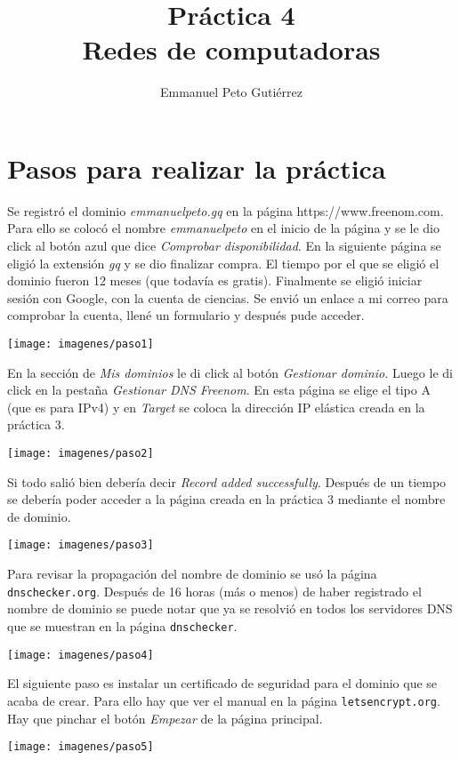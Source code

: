 \documentclass{article}
\title{Práctica 4\\Redes de computadoras}
\author{Emmanuel Peto Gutiérrez}
\begin{document}
\maketitle

\section{Pasos para realizar la práctica}

Se registró el dominio \textit{emmanuelpeto.gq} en la página https://www.freenom.com. Para ello se colocó el nombre \textit{emmanuelpeto} en el inicio de la página y se le dio click al botón azul que dice \textit{Comprobar disponibilidad}. En la siguiente página se eligió la extensión \textit{gq} y se dio finalizar compra. El tiempo por el que se eligió el dominio fueron 12 meses (que todavía es gratis). Finalmente se eligió iniciar sesión con Google, con la cuenta de ciencias. Se envió un enlace a mi correo para comprobar la cuenta, llené un formulario y después pude acceder.

\texttt{[image: imagenes/paso1]}

En la sección de \textit{Mis dominios} le di click al botón \textit{Gestionar dominio.} Luego le di click en la pestaña \textit{Gestionar DNS Freenom}. En esta página se elige el tipo A (que es para IPv4) y en \textit{Target} se coloca la dirección IP elástica creada en la práctica 3.

\texttt{[image: imagenes/paso2]}

Si todo salió bien debería decir \textit{Record added successfully}. Después de un tiempo se debería poder acceder a la página creada en la práctica 3 mediante el nombre de dominio.

\texttt{[image: imagenes/paso3]}

Para revisar la propagación del nombre de dominio se usó la página \texttt{dnschecker.org}. Después de 16 horas (más o menos) de haber registrado el nombre de dominio se puede notar que ya se resolvió en todos los servidores DNS que se muestran en la página \texttt{dnschecker}.

\texttt{[image: imagenes/paso4]}

El siguiente paso es instalar un certificado de seguridad para el dominio que se acaba de crear. Para ello hay que ver el manual en la página \texttt{letsencrypt.org}. Hay que pinchar el botón \textit{Empezar} de la página principal.

\texttt{[image: imagenes/paso5]}
\end{document}
